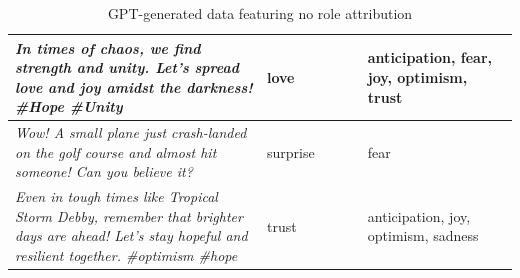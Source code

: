 \documentclass[manuscript]{clv3}
\begin{document}
\begin{table} [hbt!]
\begin{tabular}{|>{\centering\arraybackslash}p{0.5\linewidth}|>{\centering\arraybackslash}p{0.2\linewidth}|>{\centering\arraybackslash}p{0.3\linewidth}|}
 \textit{In times of chaos, we find strength and unity. Let's spread love and joy amidst the darkness! \#Hope \#Unity}& love&anticipation, fear, joy, optimism, trust\\\hline
 \textit{Wow! A small plane just crash-landed on the golf course and almost hit someone! Can you believe it? }& surprise&fear\\\hline
 \textit{Even in tough times like Tropical Storm Debby, remember that brighter days are ahead! Let's stay hopeful and resilient together. \#optimism \#hope}& trust&anticipation, joy, optimism, sadness\\\hline
     \end{tabular}
    \caption{GPT-generated data featuring no role attribution}
    \label{tab:no_role_examples}
\end{table}
\end{document}
